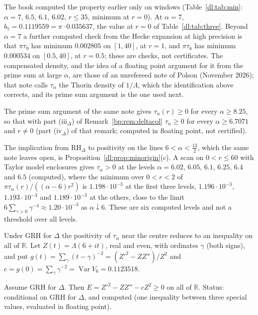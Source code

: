 The book computed the property earlier only on windows (Table~\ref{dl:tab:min}: $\alpha=7$, $6.5$, $6.1$, $6.02$, $r\le35$, minimum at $r=0$). At $\alpha=7$, $b_7=0.1119559=\pi\cdot0.035637$, the value at $r=0$ of Table~\ref{dl:tab:three}. Beyond $\alpha=7$ a further computed check from the Hecke expansion at high precision is that $\pi\tau_9$ has minimum $0.002805$ on $[1,40]$, at $r=1$, and $\pi\tau_8$ has minimum $0.000534$ on $[0.5,40]$, at $r=0.5$; these are checks, not certificates. The compensated density, and the idea of a floating point argument for it from the prime sum at large $\alpha$, are those of an unrefereed note of Polson (November 2026); that note calls $\tau_\alpha$ the Thorin density of $1/\Lambda$, which the identification above corrects, and its prime sum argument is the one used next.

The prime sum argument of the same note gives $\tau_\alpha(r)\ge0$ for every $\alpha\ge8.25$, so that with part (iii$_\Delta$) of Remark~\ref{bp:rem:deltacol} $\tau_\alpha\ge0$ for every $\alpha\ge6.7071$ and $r\ne0$ (part (iv$_\Delta$) of that remark; computed in floating point, not certified).

The implication from $\mathrm{RH}_\Delta$ to positivity on the lines $6<\alpha<\frac{13}2$, which the same note leaves open, is Proposition~\ref{dl:prop:minorigin}(c). A scan on $0<r\le60$ with Taylor model enclosures gives $\tau_\alpha>0$ at the levels $\alpha=6.02$, $6.05$, $6.1$, $6.25$, $6.4$ and $6.5$ (computed), where the minimum over $0<r<2$ of $\pi\tau_\alpha(r)/((\alpha-6)r^2)$ is $1.198\cdot10^{-3}$ at the first three levels, $1.196\cdot10^{-3}$, $1.193\cdot10^{-3}$ and $1.189\cdot10^{-3}$ at the others, close to the limit $6\sum_{\gamma>0}\gamma^{-4}\approx1.20\cdot10^{-3}$ as $\alpha\downarrow6$. These are six computed levels and not a threshold over all levels.

Under GRH for $\Delta$ the positivity of $\tau_\alpha$ near the centre reduces to an inequality on all of $\mathbb R$. Let $Z(t)=\Lambda(6+it)$, real and even, with ordinates $\gamma$ (both signs), and put $g(t)=\sum_\gamma(t-\gamma)^{-2}=(Z'^2-ZZ'')/Z^2$ and $c=g(0)=\sum_\gamma\gamma^{-2}=\operatorname{Var}V_6=0.1123518$.

\begin{corollary}\label{dl:cor:laguerre}
Assume GRH for $\Delta$. Then $E=Z'^2-ZZ''-cZ^2\ge0$ on all of $\mathbb R$. Status: conditional on GRH for $\Delta$, and computed (one inequality between three special values, evaluated in floating point).
\end{corollary}

